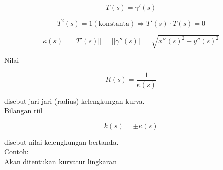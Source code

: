 \documentclass[12pt,arial,letterpaper]{book}
\begin{document}
\begin{eulernootebook}
\begin{eulercomment}
\begin{eulercomment}
\begin{eulernootebook}
\begin{eulercomment}
\begin{eulercomment}
\begin{eulercomment}
\begin{eulercomment}
\begin{eulercomment}
\begin{eulercomment}
\begin{eulernotebook}
\begin{eulercomment}
\begin{eulercomment}
\begin{eulercomment}
\begin{eulercomment}
\begin{eulercomment}
\begin{eulercomment}
\begin{eulercomment}
\begin{eulercomment}
\begin{eulercomment}
\begin{eulercomment}
\begin{eulercomment}
\begin{eulercomment}
\begin{eulercomment}
\begin{eulercomment}
\begin{eulercomment}
\begin{eulercomment}
\begin{eulercomment}
\begin{eulercomment}
\begin{eulercomment}
\begin{eulercomment}
\begin{eulercomment}
\end{eulercomment}
\begin{eulerformula}
\[
T(s)=\gamma'(s)
\]
\end{eulerformula}
\begin{eulerformula}
\[
T^2(s)=1(\text{konstanta})\Rightarrow T'(s)\cdot T(s)=0
\]
\end{eulerformula}
\begin{eulerformula}
\[
\kappa(s)=||T'(s)||=||\gamma''(s)||=\sqrt{x''(s)^2+y''(s)^2}
\]
\end{eulerformula}
\begin{eulercomment}
Nilai

\end{eulercomment}
\begin{eulerformula}
\[
R(s)=\frac{1}{\kappa(s)}
\]
\end{eulerformula}
\begin{eulercomment}
disebut jari-jari (radius) kelengkungan kurva.\\
Bilangan riil

\end{eulercomment}
\begin{eulerformula}
\[
k(s)=\pm \kappa(s)
\]
\end{eulerformula}
\begin{eulercomment}
disebut nilai kelengkungan bertanda.\\
Contoh:\\
Akan ditentukan kurvatur lingkaran


\end{eulercomment}
\end{eulercomment}
\end{eulercomment}
\end{eulercomment}
\end{eulercomment}
\end{eulercomment}
\end{eulercomment}
\end{eulercomment}
\end{eulercomment}
\end{eulercomment}
\end{eulercomment}
\end{eulercomment}
\end{eulercomment}
\end{eulercomment}
\end{eulercomment}
\end{eulercomment}
\end{eulercomment}
\end{eulercomment}
\end{eulercomment}
\end{eulercomment}
\end{eulercomment}
\end{eulernotebook}
\end{eulercomment}
\end{eulercomment}
\end{eulercomment}
\end{eulercomment}
\end{eulercomment}
\end{eulercomment}
\end{eulernootebook}
\end{eulercomment}
\end{eulercomment}
\end{eulernootebook}
\end{document}
